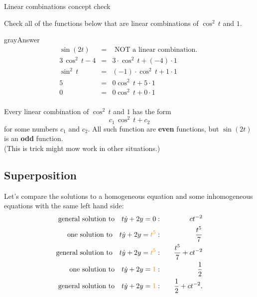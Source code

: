 \begin{exercise}
  Linear combinations concept check
\end{exercise}

Check all of the functions below that are linear combinations of
$\cos^2 \, t$ and $1$.

\begin{mybox}{gray}{Answer}
  \begin{eqnarray*}
    \sin(2t) &=& \text{ NOT a linear combination. } \\
    3\, \cos^2\, t - 4 &=& 3 \cdot \cos^2\, t + (-4) \cdot 1 \\
    \sin^2 \, t &=& (-1) \cdot \cos^2 \, t + 1 \cdot 1\\
    5 &=& 0 \cos^2\, t + 5 \cdot 1\\
    0 &=& 0 \cos^2\, t + 0 \cdot 1 \\
  \end{eqnarray*}

  Every linear combination of $\cos^2 \, t$ and $1$ has the form
  \begin{equation*}
    c_1 \, \cos^2 \, t + c_2
  \end{equation*}
  for some numbers $c_1$ and $c_2$. All such function are \textbf{even} functions,
  but $\sin(2t)$ is an \textbf{odd} function. \\
  (\Warning This is trick might mow work in other situations.) 
\end{mybox}
\clearpage

\subsection{Superposition}
Let's compare the solutions to a homogeneous equation
and some inhomogeneous equations with the same left hand side:
\begin{eqnarray*}
  \displaystyle  \text {general solution to} \quad
  \displaystyle  t \dot{y} + 2 y = 0
  & : & \quad \displaystyle  ct^{-2} \\
  \displaystyle  \text {one solution to} \quad
  \displaystyle  t \dot{y} + 2 y = {\color{orange}{t^5}}
  & : & \quad \displaystyle  \frac{t^5}{7} \\
  \displaystyle  \text {general solution to} \quad
  \displaystyle  t \dot{y} + 2 y = {\color{orange}{t^5}}
  & : & \quad \displaystyle  \frac{t^5}{7} + ct^{-2} \\
  \displaystyle  \text {one solution to} \quad
  \displaystyle  t \dot{y} + 2 y = {\color{orange}{1}}
  & : & \quad \displaystyle  \frac{1}{2} \\
  \displaystyle  \text {general solution to} \quad
  \displaystyle  t \dot{y} + 2 y = {\color{orange}{1}}
  & : & \quad \displaystyle  \frac{1}{2} + ct^{-2}. 
\end{eqnarray*}

